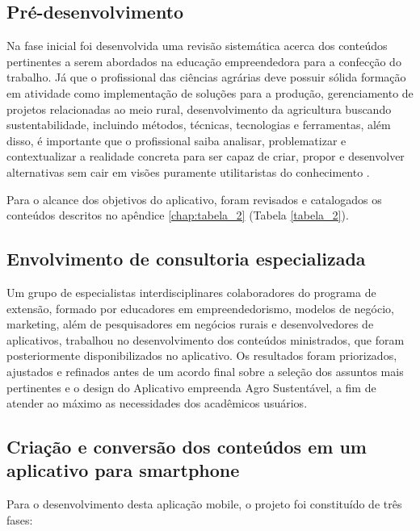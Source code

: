 \subsection{Pré-desenvolvimento}

Na fase inicial foi desenvolvida uma revisão sistemática acerca dos conteúdos pertinentes a serem abordados na educação empreendedora para a confecção do trabalho. Já que o profissional das ciências agrárias deve possuir sólida formação em atividade como implementação de soluções para a produção, gerenciamento de projetos relacionadas ao meio rural, desenvolvimento da agricultura buscando sustentabilidade, incluindo métodos, técnicas, tecnologias e ferramentas, além disso, é importante que o profissional saiba analisar, problematizar e contextualizar a realidade concreta para ser capaz de criar, propor e desenvolver alternativas sem cair em visões puramente utilitaristas do conhecimento \cite{cavalcanti_da_2019}.

Para o alcance dos objetivos do aplicativo, foram revisados e catalogados os conteúdos descritos no apêndice \ref{chap:tabela_2} (Tabela \ref{tabela_2}). 



\subsection{Envolvimento de consultoria especializada}

Um grupo de especialistas interdisciplinares colaboradores do programa de extensão, formado por educadores em empreendedorismo, modelos de negócio, marketing, além de pesquisadores em negócios rurais e desenvolvedores de aplicativos, trabalhou no desenvolvimento dos conteúdos ministrados, que foram posteriormente disponibilizados no aplicativo. Os resultados foram priorizados, ajustados e refinados antes de um acordo final sobre a seleção dos assuntos mais pertinentes e o design do Aplicativo empreenda Agro Sustentável, a fim de atender ao máximo as necessidades dos acadêmicos usuários.



\subsection{Criação e conversão dos conteúdos em um aplicativo para smartphone}

Para o desenvolvimento desta aplicação mobile, o projeto foi constituído de três fases: 

